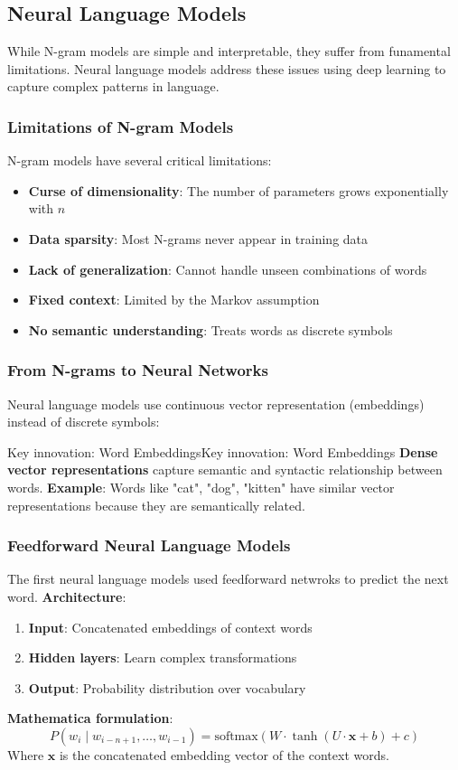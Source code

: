 \documentclass[a4paper]{article}
\theoremstyle{definition}
\begin{document}
\subsection{Neural Language Models}
While N-gram models are simple and interpretable, they suffer from funamental limitations.
Neural language models address these issues using deep learning to capture complex 
patterns in language.
\subsubsection{Limitations of N-gram Models}
N-gram models have several critical limitations:
\begin{itemize}
    \item \textbf{Curse of dimensionality}: The number of parameters grows exponentially with \( n \)   
    \item \textbf{Data sparsity}: Most N-grams never appear in training data 
    \item \textbf{Lack of generalization}: Cannot handle unseen combinations of words 
    \item \textbf{Fixed context}: Limited by the Markov assumption 
    \item \textbf{No semantic understanding}: Treats words as discrete symbols
\end{itemize}
\subsubsection{From N-grams to Neural Networks}
Neural language models use continuous vector representation (embeddings) instead of discrete symbols:
\begin{definition}{Key innovation: Word Embeddings}{Key innovation: Word Embeddings}
\textbf{Dense vector representations} capture semantic and syntactic relationship between words. 
\newline
\textbf{Example}: Words like "cat", "dog", "kitten" have similar vector representations because they are semantically related.
\end{definition}
\subsubsection{Feedforward Neural Language Models}
The first neural language models used feedforward netwroks to predict the next word.
\vspace{1em}
\noindent
\newline
\textbf{Architecture}:
\begin{enumerate}
    \item \textbf{Input}: Concatenated embeddings of context words 
    \item \textbf{Hidden layers}: Learn complex transformations 
    \item \textbf{Output}: Probability distribution over vocabulary
\end{enumerate}
\textbf{Mathematica formulation}:
\[
  P(w_i \;|\; w_{i - n + 1}, \ldots, w_{i - 1}) = \text{softmax}(W \cdot \tanh(U \cdot \mathbf{x} + b) + c)
\]
Where \( \mathbf{x} \) is the concatenated embedding vector of the context words.
\end{document}
